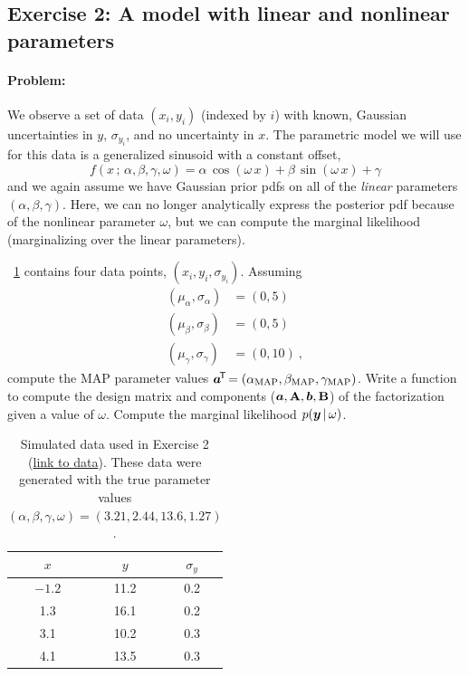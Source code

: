 \subsection{Exercise 2: A model with linear and nonlinear parameters}

\paragraph{Problem:} We observe a set of data $(x_i, y_i)$ (indexed by $i$) with
known, Gaussian uncertainties in $y$, $\sigma_{y_i}$, and no uncertainty in $x$.
The parametric model we will use for this data is a generalized sinusoid with a
constant offset,
\begin{equation}
  f(x \,;\, \alpha, \beta, \gamma, \omega) =
    \alpha\,\cos(\omega \, x) + \beta\,\sin(\omega \, x) + \gamma
\end{equation}
and we again assume we have Gaussian prior pdfs on all of the \emph{linear}
parameters $(\alpha, \beta, \gamma)$.
Here, we can no longer analytically express the posterior pdf because of the
nonlinear parameter $\omega$, but we can compute the marginal likelihood
(marginalizing over the linear parameters).

\tablename~\ref{tbl:data2} contains four data points, $(x_i, y_i,
\sigma_{y_i})$.
Assuming
\begin{align}
  (\mu_\alpha, \sigma_\alpha) &= (0, 5)\\
  (\mu_\beta, \sigma_\beta) &= (0, 5)\\
  (\mu_\gamma, \sigma_\gamma) &= (0, 10) ~ ,
\end{align}
compute the MAP parameter values $\boldsymbol{a}^{\!\mathsf{T}\!} = (\alpha_{\rm MAP}, \beta_{\rm MAP},
\gamma_{\rm MAP})$.
Write a function to compute the design matrix and components ($\boldsymbol{a}, \mathbf{A}, \boldsymbol{b}, \mathbf{B}$) of the factorization
 given a value of $\omega$.
Compute the marginal likelihood $p(\boldsymbol{y}\,|\,\omega)$.

\begin{table}[t!]
  \footnotesize
  \begin{center}
    \begin{tabular}{c|c|c}
      $x$ & $y$ & $\sigma_y$ \\
      \hline
      $-1.2$ & 11.2 & 0.2 \\
      1.3 & 16.1 & 0.2 \\
      3.1 & 10.2 & 0.3 \\
      4.1 & 13.5 & 0.3
    \end{tabular}
    \caption{Simulated data used in Exercise 2
    (\href{https://raw.githubusercontent.com/davidwhogg/GaussianProductRefactor/master/notebooks/data2.csv}{link to data}). These data were generated with the true parameter values $(\alpha, \beta, \gamma, \omega) = (3.21, 2.44, 13.6, 1.27)$.
    \label{tbl:data2}}
  \end{center}
\end{table}



